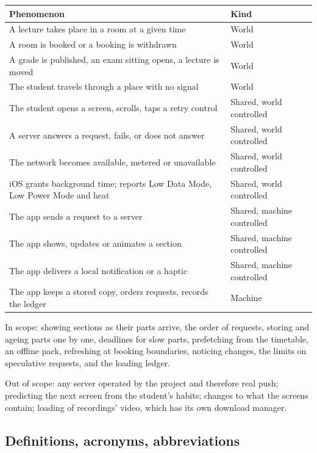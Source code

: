 \begin{center}\small
\begin{tabularx}{\linewidth}{@{}X l@{}}
  \toprule
  Phenomenon & Kind \\
  \midrule
  A lecture takes place in a room at a given time & World \\
  A room is booked or a booking is withdrawn & World \\
  A grade is published, an exam sitting opens, a lecture is moved & World \\
  The student travels through a place with no signal & World \\
  The student opens a screen, scrolls, taps a retry control & Shared, world controlled \\
  A server answers a request, fails, or does not answer & Shared, world controlled \\
  The network becomes available, metered or unavailable & Shared, world controlled \\
  iOS grants background time; reports Low Data Mode, Low Power Mode and heat & Shared, world controlled \\
  The app sends a request to a server & Shared, machine controlled \\
  The app shows, updates or animates a section & Shared, machine controlled \\
  The app delivers a local notification or a haptic & Shared, machine controlled \\
  The app keeps a stored copy, orders requests, records the ledger & Machine \\
  \bottomrule
\end{tabularx}
\end{center}

In scope: showing sections as their parts arrive, the order of requests, storing and
ageing parts one by one, deadlines for slow parts, prefetching from the timetable, an
offline pack, refreshing at booking boundaries, noticing changes, the limits on
speculative requests, and the loading ledger.

Out of scope: any server operated by the project and therefore real push; predicting
the next screen from the student's habits; changes to what the screens contain;
loading of recordings' video, which has its own download manager.

\subsection{Definitions, acronyms, abbreviations}
\printterms

